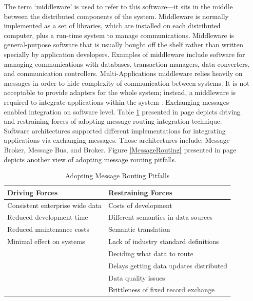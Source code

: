 \documentclass[12pt,a4paper,final,twoside,onecolumn,titlepage]{book}
\begin{document}
\begin{itemize}
The term ‘middleware’ is used to refer to this software—it sits in the middle between the distributed components of the system. Middleware is normally implemented as a set of libraries, which are installed on each distributed computer, plus a run-time system to manage communications. Middleware is general-purpose software that is usually bought off the shelf rather than written specially by application developers. Examples of middleware include software for managing communications with databases, transaction managers, data converters, and communication controllers. Multi-Applications middleware relies heavily on messages in order to hide complexity of communication between systems. It is not acceptable to provide adapters for the whole system; instead, a middleware is required to integrate applications within the system \cite{M36}. Exchanging messages enabled integration on software level. Table \ref{MT5} presented in page \pageref{MT5} depicts driving and restraining forces of adopting message routing integration technique. Software architectures supported different implementations for integrating applications via exchanging messages. Those architectures include: Message Broker, Message Bus, and Broker. Figure \ref{MessageRouting} presented in page \pageref{MessageRouting} depicts another view of adopting message routing pitfalls.
\begin{table}
\begin{center}
\caption{Adopting Message Routing Pitfalls}
\begin{tabularx}{\textwidth}{|X|X|}
\hline Driving Forces & Restraining Forces \\
\hline Consistent enterprise wide data & Costs of development \\
\hline Reduced development time & Different semantics in data sources\\
\hline Reduced maintenance costs & Semantic translation\\
\hline Minimal effect on systems & Lack of industry standard definitions\\
\hline & Deciding what data to route \\
\hline & Delays getting data updates distributed \\
\hline & Data quality issues\\
\hline & Brittleness of fixed record exchange \\
\hline
\end{tabularx}
\end{center}
\label{MT5}
\end{table}


\end{itemize}
\end{document}
